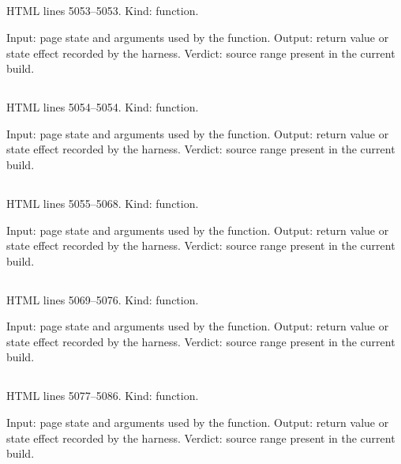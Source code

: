 \subsection*{\texttt{}}
\label{vf_217_csvOf}
HTML lines 5053--5053. Kind: function.

Input: page state and arguments used by the function.
Output: return value or state effect recorded by the harness.
Verdict: source range present in the current build.

\subsection*{\texttt{}}
\label{vf_218_sheetOf}
HTML lines 5054--5054. Kind: function.

Input: page state and arguments used by the function.
Output: return value or state effect recorded by the harness.
Verdict: source range present in the current build.

\subsection*{\texttt{}}
\label{vf_219_sopReadme}
HTML lines 5055--5068. Kind: function.

Input: page state and arguments used by the function.
Output: return value or state effect recorded by the harness.
Verdict: source range present in the current build.

\subsection*{\texttt{}}
\label{vf_220_sopDownloadWorkbook}
HTML lines 5069--5076. Kind: function.

Input: page state and arguments used by the function.
Output: return value or state effect recorded by the harness.
Verdict: source range present in the current build.

\subsection*{\texttt{}}
\label{vf_221_sopDownloadBundle}
HTML lines 5077--5086. Kind: function.

Input: page state and arguments used by the function.
Output: return value or state effect recorded by the harness.
Verdict: source range present in the current build.

